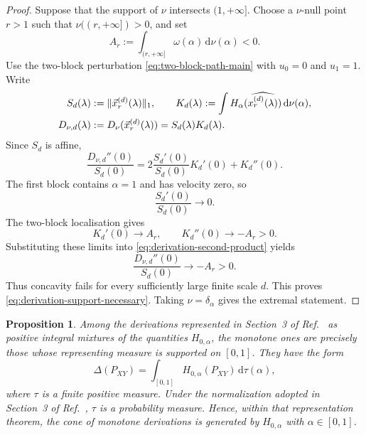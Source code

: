 \documentclass[aps,pra,11pt,onecolumn,nofootinbib,tightenlines]{revtex4-2}
\newtheorem{proposition}[theorem]{Proposition}
\theoremstyle{definition}
\begin{document}
\begin{proof}
Suppose that the support of $\nu$ intersects $(1,+\infty]$. Choose a $\nu$-null point $r>1$ such that $\nu((r,+\infty])>0$, and set
\begin{equation}
 A_r:=\int_{(r,+\infty]}\omega(\alpha)\,\mathrm d\nu(\alpha)<0.
 \label{eq:derivation-A-r}
\end{equation}
Use the two-block perturbation \eqref{eq:two-block-path-main} with $u_0=0$ and $u_1=1$. Write
\begin{align}
 S_d(\lambda)&:=\|\vec x_r^{(d)}(\lambda)\|_1,
 \qquad
 K_d(\lambda):=
 \int H_\alpha(\widehat{x_r^{(d)}(\lambda)})\,\mathrm d\nu(\alpha),
 \notag\\
 D_{\nu,d}(\lambda)
 &:=D_\nu(\vec x_r^{(d)}(\lambda))
 =S_d(\lambda)K_d(\lambda).
 \label{eq:derivation-S-K}
\end{align}
Since $S_d$ is affine,
\begin{equation}
 \frac{D_{\nu,d}''(0)}{S_d(0)}
 =2\frac{S_d'(0)}{S_d(0)}K_d'(0)+K_d''(0).
 \label{eq:derivation-second-product}
\end{equation}
The first block contains $\alpha=1$ and has velocity zero, so
\begin{equation}
 \frac{S_d'(0)}{S_d(0)}\longrightarrow0.
 \label{eq:derivation-norm-derivative-zero}
\end{equation}
The two-block localisation gives
\begin{equation}
 K_d'(0)\longrightarrow A_r,
 \qquad
 K_d''(0)\longrightarrow-A_r>0.
 \label{eq:derivation-K-limits}
\end{equation}
Substituting these limits into \eqref{eq:derivation-second-product} yields
\begin{equation}
 \frac{D_{\nu,d}''(0)}{S_d(0)}
 \longrightarrow-A_r>0.
 \label{eq:derivation-positive-curvature}
\end{equation}
Thus concavity fails for every sufficiently large finite scale $d$. This proves \eqref{eq:derivation-support-necessary}. Taking $\nu=\delta_\alpha$ gives the extremal statement.
\end{proof}

\begin{proposition}
\label{prop:derivation-classification}
Among the derivations represented in Section~3 of Ref.~\cite{rubboli2026complete} as positive integral mixtures of the quantities $H_{0,\alpha}$, the monotone ones are precisely those whose representing measure is supported on $[0,1]$. They have the form
\begin{equation}
 \Delta(P_{XY})
 =\int_{[0,1]}H_{0,\alpha}(P_{XY})\,\mathrm d\tau(\alpha),
 \label{eq:derivation-final-classification}
\end{equation}
where $\tau$ is a finite positive measure. Under the normalization adopted in Section~3 of Ref.~\cite{rubboli2026complete}, $\tau$ is a probability measure. Hence, within that representation theorem, the cone of monotone derivations is generated by $H_{0,\alpha}$ with $\alpha\in[0,1]$.
\end{proposition}
\end{document}

